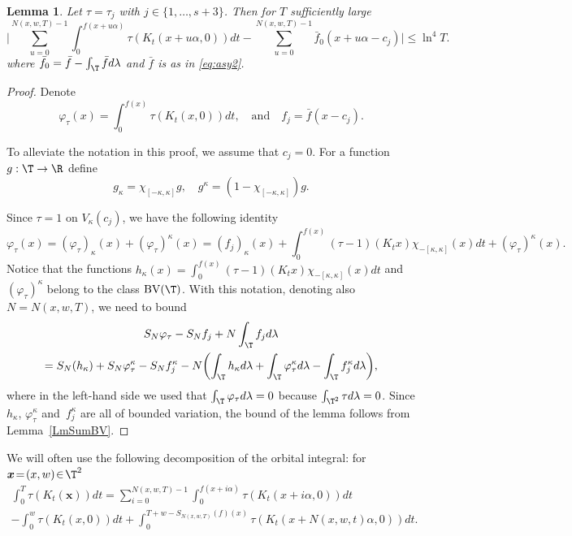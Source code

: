 \documentclass[10pt]{amsart}
\newcommand\BV{\mathrm{BV}}
\newcommand\bx{\boldsymbol{x}}
\theoremstyle{definition}
\theoremstyle{plain}
\newtheorem{lemma}[definition]{Lemma}
\begin{document}
\begin{lemma}
\label{LmErgSumRetT}
Let $\tau=\tau_j$ with $j\in \{1,\ldots, s+3\}$. Then for $T$ sufficiently large
\[
\biggl|\sum_{u=0}^{N(x,w,T)-1}\int_0^{f(x+u\alpha)}\tau(K_t(x+u\alpha,0))dt-\sum_{u=0}^{N(x,w,T)-1}\bar{f}_0(x+u\alpha-c_j)\biggr|\leq \ln^4T.
\]
where $\bar{f}_0=\bar{f}-\int_\T \bar{f} d\lambda$ and $\bar{f}$ is as in \eqref{eq:asy2}.
\end{lemma}

\begin{proof}
Denote
\[
\varphi_{\tau}(x)=\int_0^{f(x)}\tau(K_t(x,0))d{t}, \quad\text{and}\quad
f_j=\bar{f}(x-c_j).
\]

To alleviate the notation in this proof, we assume that $c_j=0$. For a function $g:\T \to \R$ define
\[
g_\kappa=\chi_{[-\kappa,\kappa]} g, \quad g^\kappa=(1-\chi_{[-\kappa,\kappa]}) g.
\]

Since $\tau=1$ on $V_\kappa(c_j)$, we have the following identity
\[
\varphi_\tau(x)=(\varphi_\tau)_{\kappa}(x)+(\varphi_\tau)^{\kappa}(x)= (f_j)_{\kappa}(x)+ \int_{0}^{f(x)}(\tau-1)(K_tx)\chi_{-[\kappa,\kappa]}(x)d{t}+(\varphi_\tau)^{\kappa}(x).
\]
Notice that the functions $h_\kappa(x)=\int_{0}^{f(x)}(\tau-1)(K_tx)\chi_{-[\kappa,\kappa]}(x)d{t}$ and $(\varphi_\tau)^{\kappa}$ belong to the class $\BV(\T)$.
With this notation, denoting also $N=N(x,w,T)$, we need to bound
\begin{multline*}
S_N \varphi_\tau-S_N f_j +N\int_{\T} f_j d\lambda\\
= S_N(h_\kappa)+
S_N \varphi_\tau^\kappa-S_N f_j^\kappa -N\biggl(\int_{\T} h_\kappa d\lambda+\int_{\T} \varphi_\tau^\kappa d\lambda-\int_{\T} f_j^\kappa d\lambda \biggr),
\end{multline*}
where in the left-hand side we used that $\int_{\T} \varphi_{\tau} d\lambda=0$ because $\int_{\T^2} \tau d\lambda=0$.
Since $h_\kappa$, $\varphi_{\tau}^{\kappa}$ and~$f_j^{\kappa}$ are all of bounded variation,
the bound of the lemma follows from Lemma~\ref{LmSumBV}.
\end{proof}

\noindent We will often use the following decomposition of the orbital integral: for $\bx\!=\!(x,w)\!\in\! \T^2$\vspace*{-5pt}
\begin{multline}\label{mult:dec}
\int_{0}^T\tau(K_t(\bx))dt=\sum_{i=0}^{N(x,w,T)-1}\int_0^{f(x+i\alpha)}\tau(K_t(x+i\alpha,0))dt\\
-\int_0^w\tau(K_t(x,0))dt+ \int_0^{T+w-S_{N(x,w,T)}(f)(x)}\tau(K_t(x+N(x,w,t)\alpha,0))dt.
\end{multline}
\end{document}
